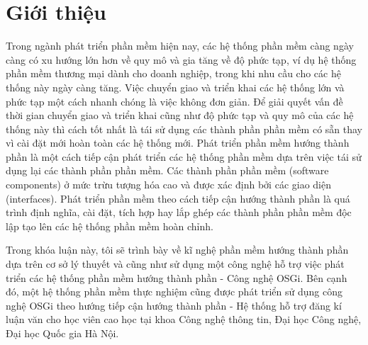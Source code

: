 \chapter{Giới thiệu}


Trong ngành phát triển phần mềm hiện nay, các hệ thống phần mềm càng ngày càng có xu hướng lớn hơn về quy mô và gia tăng về độ phức tạp, ví dụ hệ thống phần mềm thương mại dành cho doanh nghiệp, trong khi nhu cầu cho các hệ thống này ngày càng tăng. Việc chuyển giao và triển khai các hệ thống lớn và phức tạp một cách nhanh chóng là việc không đơn giản. Để giải quyết vấn đề thời gian chuyển giao và triển khai cũng như độ phức tạp và quy mô của các hệ thống này thì cách tốt nhất là tái sử dụng các thành phần phần mềm có sẵn thay vì cài đặt mới hoàn toàn các hệ thống mới.
Phát triển phần mềm hướng thành phần là một cách tiếp cận phát triển các hệ thống phần mềm dựa trên việc tái sử dụng lại các thành phần phần mềm.
Các thành phần phần mềm (software components) ở mức trừu tượng hóa cao và được xác định bởi các giao diện (interfaces). Phát triển phần mềm theo cách tiếp cận hướng thành phần là quá trình định nghĩa, cài đặt, tích hợp hay lắp ghép các thành phần phần mềm độc lập tạo lên các hệ thống phần mềm hoàn chỉnh.

Trong khóa luận này, tôi sẽ trình bày về kĩ nghệ phần mềm hướng thành phần dựa trên cơ sở lý thuyết và cũng như sử dụng một công nghệ hỗ trợ việc phát triển các hệ thống phần mềm hướng thành phần - Công nghệ OSGi. Bên cạnh đó, một hệ thống phần mềm thực nghiệm cũng được phát triển sử dụng công nghệ OSGi theo hướng tiếp cận hướng thành phần - Hệ thống hỗ trợ đăng kí luận văn cho học viên cao học tại khoa Công nghệ thông tin, Đại học Công nghệ, Đại học Quốc gia Hà Nội.
